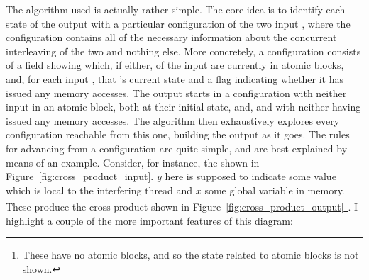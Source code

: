 The algorithm used is actually rather simple.  The core idea is to
identify each state of the output {\StateMachine} with a particular
configuration of the two input {\StateMachines}, where the
configuration contains all of the necessary information about the
concurrent interleaving of the two {\StateMachines} and nothing else.
More concretely, a configuration consists of a field showing which, if
either, of the input {\StateMachines} are currently in atomic blocks,
and, for each input {\StateMachine}, that {\StateMachine}'s current
state and a flag indicating whether it has issued any memory accesses.
The output {\StateMachine} starts in a configuration with neither
input {\StateMachine} in an atomic block, both {\StateMachines} at
their initial state, and, and with neither having issued any memory
accesses.  The algorithm then exhaustively explores every
configuration reachable from this one, building the output
{\StateMachine} as it goes.  The rules for advancing from a
configuration are quite simple, and are best explained by means of an
example.  Consider, for instance, the {\StateMachines} shown in
Figure~\ref{fig:cross_product_input}.  $y$ here is supposed to
indicate some value which is local to the interfering thread
{\StateMachine} and $x$ some global variable in memory.  These produce
the cross-product {\StateMachine} shown in
Figure~\ref{fig:cross_product_output}\footnote{These {\StateMachines}
  have no atomic blocks, and so the state related to atomic blocks is
  not shown.}.  I highlight a couple of the more important features of
this diagram:

